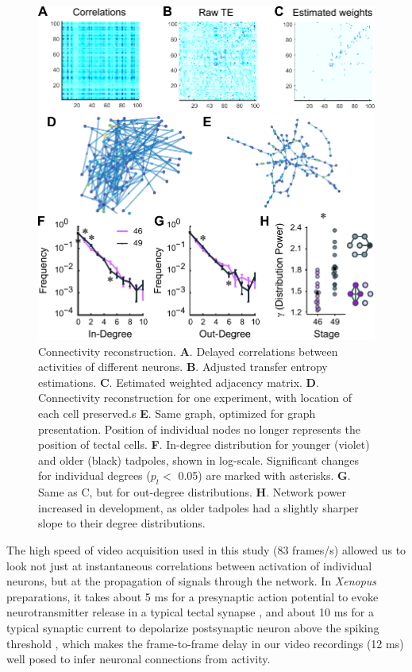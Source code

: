 \documentclass{article}
\begin{document}
\begin{figure}[t!]
\includegraphics[width=\linewidth]{fig4.pdf}
\caption{
Connectivity reconstruction.  \textbf{A}. Delayed correlations between activities of different neurons. \textbf{B}. Adjusted transfer entropy estimations. \textbf{C}. Estimated weighted adjacency matrix. \textbf{D}. Connectivity reconstruction for one experiment, with location of each cell preserved.s \textbf{E}. Same graph, optimized for graph presentation. Position of individual nodes no longer represents the position of tectal cells. \textbf{F}. In-degree distribution for younger (violet) and older (black) tadpoles, shown in log-scale. Significant changes for individual degrees ($p_t<$ 0.05) are marked with asterisks. \textbf{G}. Same as C, but for out-degree distributions. \textbf{H}. Network power increased in development, as older tadpoles had a slightly sharper slope to their degree distributions. }
\end{figure}

The high speed of video acquisition used in this study (83 frames/s) allowed us to look not just at instantaneous correlations between activation of individual neurons, but at the propagation of signals through the network. In \textit{Xenopus} preparations, it takes about 5 ms for a presynaptic action potential to evoke neurotransmitter release in a typical tectal synapse \citep{khakhalin2012}, and about 10 ms for a typical synaptic current to depolarize postsynaptic neuron above the spiking threshold \citep{ciarleglio2015,busch2019}, which makes the frame-to-frame delay in our video recordings (12 ms) well posed to infer neuronal connections from activity.
\end{document}
